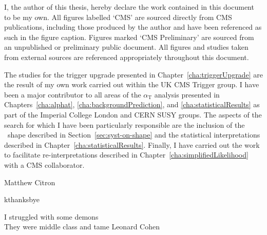 \begin{declaration}
I, the author of this thesis, hereby declare the work contained in this 
document to be my own. All figures labelled `CMS' are sourced directly from CMS publications, 
including those produced by the author and have been referenced as such 
in the figure caption. Figures marked `CMS Preliminary' are sourced from an unpublished 
or preliminary public document. All figures and studies taken from external sources are referenced appropriately 
throughout this document.

The studies for the trigger upgrade presented in Chapter~\ref{cha:triggerUpgrade} are 
the result of my own work carried out within the UK CMS Trigger group. I have
been a major contributor to all areas of the $\alpha_\text{T}$ 
analysis presented in Chapters~\ref{cha:alphat}, \ref{cha:backgroundPrediction}, 
and \ref{cha:statisticalResults} as part of the Imperial College London and CERN SUSY groups.
The aspects of the search for which I have been particularly responsible are 
the inclusion of the \mht~shape described in Section~\ref{sec:syst-on-shape} 
and the statistical interpretations described in Chapter~\ref{cha:statisticalResults}.
Finally, I have carried out the work to facilitate re-interpretations described in 
Chapter~\ref{cha:simplifiedLikelihood} with a CMS collaborator.
  \begin{flushright}
    Matthew Citron
  \end{flushright}
\end{declaration}


\begin{acknowledgements}
kthanksbye
\end{acknowledgements}



\tableofcontents

\listoffigures
\listoftables
\frontquote%
  {I struggled with some demons\\ They were middle class and tame}
  {Leonard Cohen}
